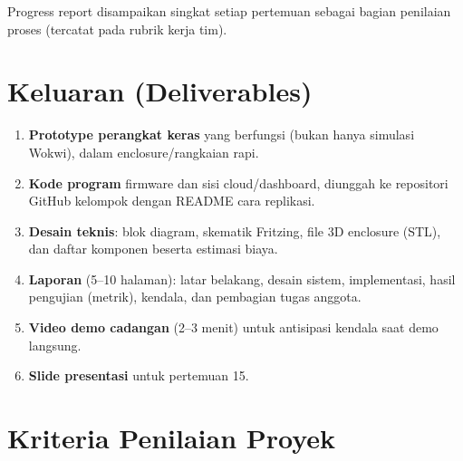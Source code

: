 \documentclass[11pt,a4paper]{article}
\begin{document}
Progress report disampaikan singkat setiap pertemuan sebagai bagian penilaian
proses (tercatat pada rubrik kerja tim).

\section{Keluaran (Deliverables)}

\begin{enumerate}
  \item \textbf{Prototype perangkat keras} yang berfungsi (bukan hanya
        simulasi Wokwi), dalam enclosure/rangkaian rapi.
  \item \textbf{Kode program} firmware dan sisi cloud/dashboard, diunggah ke
        repositori GitHub kelompok dengan README cara replikasi.
  \item \textbf{Desain teknis}: blok diagram, skematik Fritzing, file 3D
        enclosure (STL), dan daftar komponen beserta estimasi biaya.
  \item \textbf{Laporan} (5--10 halaman): latar belakang, desain sistem,
        implementasi, hasil pengujian (metrik), kendala, dan pembagian tugas
        anggota.
  \item \textbf{Video demo cadangan} (2--3 menit) untuk antisipasi kendala
        saat demo langsung.
  \item \textbf{Slide presentasi} untuk pertemuan 15.
\end{enumerate}

\section{Kriteria Penilaian Proyek}
\end{document}
